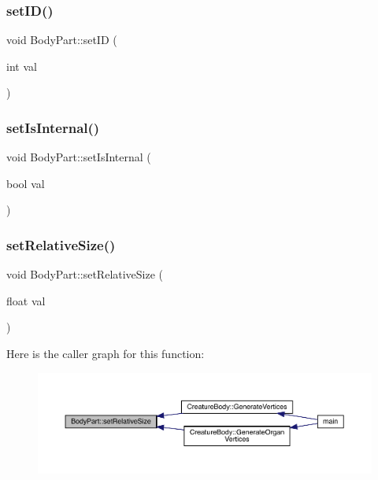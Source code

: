 \mbox{\label{class_body_part_ac4d2365cc57317596096db2b56f52c91}} 
\subsubsection{\texorpdfstring{set\+I\+D()}{setID()}}
{\footnotesize\ttfamily void Body\+Part\+::set\+ID (\begin{DoxyParamCaption}\item[{int}]{val }\end{DoxyParamCaption})}

\mbox{\label{class_body_part_a6f1b8a920f6c5f7c7f32f51bbf721f6d}} 
\subsubsection{\texorpdfstring{set\+Is\+Internal()}{setIsInternal()}}
{\footnotesize\ttfamily void Body\+Part\+::set\+Is\+Internal (\begin{DoxyParamCaption}\item[{bool}]{val }\end{DoxyParamCaption})}

\mbox{\label{class_body_part_ab22b9412b4959e3a0a42efc79e409199}} 
\subsubsection{\texorpdfstring{set\+Relative\+Size()}{setRelativeSize()}}
{\footnotesize\ttfamily void Body\+Part\+::set\+Relative\+Size (\begin{DoxyParamCaption}\item[{float}]{val }\end{DoxyParamCaption})}

Here is the caller graph for this function\+:
\nopagebreak
\begin{figure}[H]
\begin{center}
\leavevmode
\includegraphics[width=350pt]{class_body_part_ab22b9412b4959e3a0a42efc79e409199_icgraph}
\end{center}
\end{figure}
\mbox{\label{class_body_part_acae2236af2e131dfb8a49b4ca62d0d1f}} 
